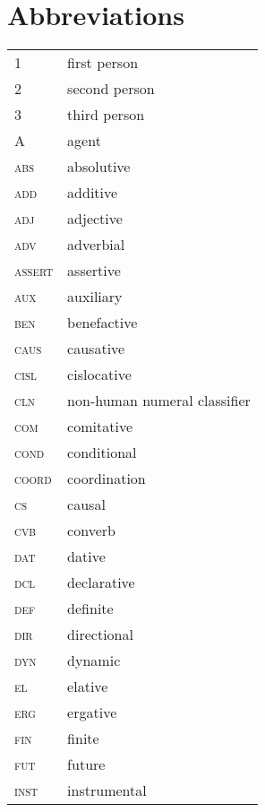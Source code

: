\documentclass[output=paper,colorlinks,citecolor=brown, draft]{langscibook}
\begin{document}
\section*{Abbreviations}
\begin{tabularx}{.45\textwidth}{@{}lQ@{}}
\textsc{1} & first person \\
\textsc{2} & second person \\
\textsc{3} & third person \\
A & agent \\
\textsc{abs} & {absolutive} \\
\textsc{add} & additive \\
\textsc{adj} & {adjective} \\
\textsc{adv} & adverbial \\
\textsc{assert} & assertive \\
\textsc{aux} & {auxiliary} \\
\textsc{ben} & {benefactive} \\
\textsc{caus} & causative \\
\textsc{cisl} & cislocative \\
\textsc{cln} & non-human numeral classifier \\
\textsc{com} & {comitative} \\
\textsc{cond} & conditional \\
\textsc{coord} & coordination \\
\textsc{cs} & causal \\
\textsc{cvb} & converb \\
\textsc{dat} & {dative} \\
\textsc{dcl} & declarative \\
\textsc{def} & definite \\
\textsc{dir} & directional \\
\textsc{dyn} & dynamic \\
\textsc{el} & elative \\
\textsc{erg} & {ergative} \\
\textsc{fin} & finite \\
\textsc{fut} & future \\
\textsc{inst} & instrumental \\
\end{tabularx}%
\end{document}
